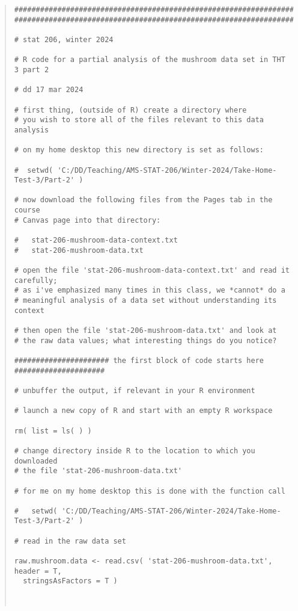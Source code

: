 \documentclass[12pt]{article}
\begin{document}
\begin{quote}

\begin{verbatim}
#################################################################################
#################################################################################

# stat 206, winter 2024

# R code for a partial analysis of the mushroom data set in THT 3 part 2

# dd 17 mar 2024

# first thing, (outside of R) create a directory where
# you wish to store all of the files relevant to this data analysis

# on my home desktop this new directory is set as follows:

#  setwd( 'C:/DD/Teaching/AMS-STAT-206/Winter-2024/Take-Home-Test-3/Part-2' )

# now download the following files from the Pages tab in the course 
# Canvas page into that directory:

#   stat-206-mushroom-data-context.txt
#   stat-206-mushroom-data.txt

# open the file 'stat-206-mushroom-data-context.txt' and read it carefully;
# as i've emphasized many times in this class, we *cannot* do a
# meaningful analysis of a data set without understanding its context

# then open the file 'stat-206-mushroom-data.txt' and look at 
# the raw data values; what interesting things do you notice?

###################### the first block of code starts here #####################

# unbuffer the output, if relevant in your R environment

# launch a new copy of R and start with an empty R workspace

rm( list = ls( ) )

# change directory inside R to the location to which you downloaded
# the file 'stat-206-mushroom-data.txt'

# for me on my home desktop this is done with the function call

#   setwd( 'C:/DD/Teaching/AMS-STAT-206/Winter-2024/Take-Home-Test-3/Part-2' )

# read in the raw data set

raw.mushroom.data <- read.csv( 'stat-206-mushroom-data.txt', header = T,
  stringsAsFactors = T )



\end{verbatim}
\end{quote}
\end{document}
